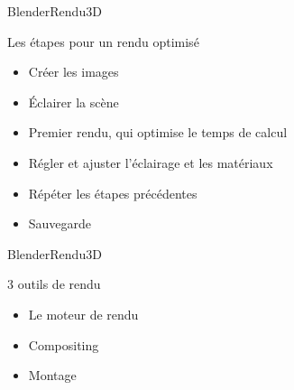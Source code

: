 \documentclass{beamer}
\begin{document}
\begin{frame}{Blender}{Rendu3D}
    \begin{block}{Les étapes pour un rendu optimisé}
    \begin{itemize}
        \item   Créer les images \\
        \item   Éclairer la scène \\
        \item   Premier rendu, qui optimise le temps de calcul \\
        \item   Régler et ajuster l'éclairage et les matériaux \\
        \item   Répéter les étapes précédentes \\
        \item   Sauvegarde  \\
         
    \end{itemize}
    \end{block}
\end{frame}

\begin{frame}{Blender}{Rendu3D}
  
    \begin{block}{3 outils de rendu}
      \begin{itemize}
        \item   Le moteur de rendu\\
        \item   Compositing\\
        \item   Montage\\
    \end{itemize}
    \end{block}
    
 
   
  
\end{frame}
\end{document}
